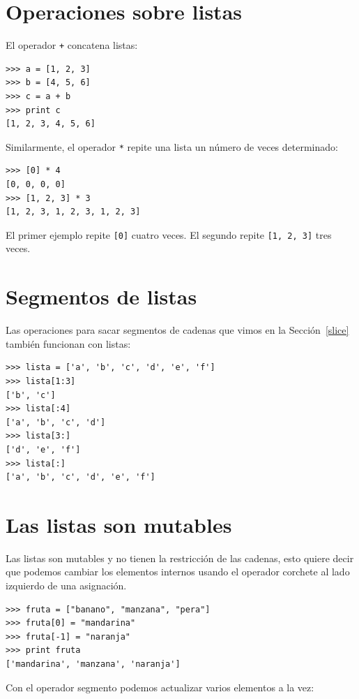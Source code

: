 \section{Operaciones sobre listas}

El operador \texttt{+}  concatena listas:


\beforeverb
\begin{verbatim}
>>> a = [1, 2, 3]
>>> b = [4, 5, 6]
>>> c = a + b
>>> print c
[1, 2, 3, 4, 5, 6]
\end{verbatim}
\afterverb
%
Similarmente, el operador \texttt{*} repite una lista un número de veces determinado:


\beforeverb
\begin{verbatim}
>>> [0] * 4
[0, 0, 0, 0]
>>> [1, 2, 3] * 3
[1, 2, 3, 1, 2, 3, 1, 2, 3]
\end{verbatim}
\afterverb
%
El primer ejemplo repite \texttt{[0]} cuatro veces. El segundo repite 
\texttt{[1, 2, 3]} tres veces.


\section{Segmentos de listas}

Las operaciones para sacar segmentos de cadenas que vimos en la 
Sección~\ref{slice} también funcionan con listas:

\beforeverb
\begin{verbatim}
>>> lista = ['a', 'b', 'c', 'd', 'e', 'f']
>>> lista[1:3]
['b', 'c']
>>> lista[:4]
['a', 'b', 'c', 'd']
>>> lista[3:]
['d', 'e', 'f']
>>> lista[:]
['a', 'b', 'c', 'd', 'e', 'f']
\end{verbatim}
\afterverb
%


\section{Las listas son  mutables}

Las listas son mutables y no tienen la restricción de las cadenas, 
esto quiere decir que podemos cambiar los elementos internos usando
el operador corchete al lado izquierdo de una asignación.

\beforeverb
\begin{verbatim}
>>> fruta = ["banano", "manzana", "pera"]
>>> fruta[0] = "mandarina"
>>> fruta[-1] = "naranja"
>>> print fruta
['mandarina', 'manzana', 'naranja']
\end{verbatim}
\afterverb
%
Con el operador segmento podemos actualizar varios elementos a la vez:

